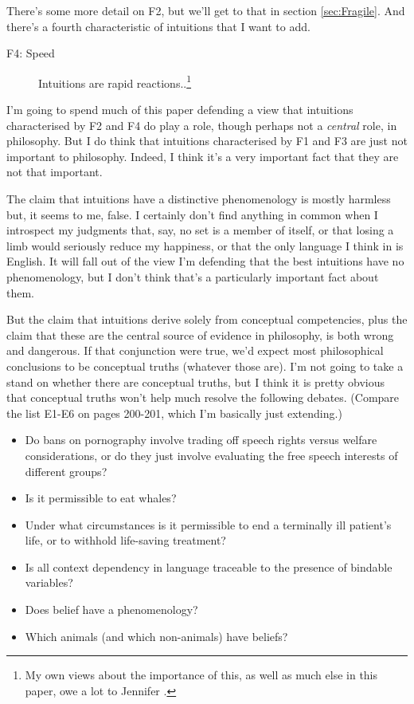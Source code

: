\noindent There's some more detail on F2, but we'll get to that in section \ref{sec:Fragile}. And there's a fourth characteristic of intuitions that I want to add.

\begin{description}
\item[F4: Speed] Intuitions are rapid reactions..\footnote{My own views about the importance of this, as well as much else in this paper, owe a lot to Jennifer \citet{Nagel2007, Nagel2013}.}
\end{description}

\noindent  I'm going to spend much of this paper defending a view that intuitions characterised by F2 and F4 do play a role, though perhaps not a \textit{central} role, in philosophy. But I do think that intuitions characterised by F1 and F3 are just not important to philosophy. Indeed, I think it's a very important fact that they are not that important.

The claim that intuitions have a distinctive phenomenology is mostly harmless but, it seems to me, false. I certainly don't find anything in common when I introspect my judgments that, say, no set is a member of itself, or that losing a limb would seriously reduce my happiness, or that the only language I think in is English. It will fall out of the view I'm defending that the best intuitions have no phenomenology, but I don't think that's a particularly important fact about them.

But the claim that intuitions derive solely from conceptual competencies, plus the claim that these are the central source of evidence in philosophy, is both wrong and dangerous. If that conjunction were true, we'd expect most philosophical conclusions to be conceptual truths (whatever those are). I'm not going to take a stand on whether there are conceptual truths, but I think it is pretty obvious that conceptual truths won't help much resolve the following debates. (Compare the list E1-E6 on pages 200-201, which I'm basically just extending.)

\begin{itemize}
\item Do bans on pornography involve trading off speech rights versus welfare considerations, or do they just involve evaluating the free speech interests of different groups?
\item Is it permissible to eat whales?
\item Under what circumstances is it permissible to end a terminally ill patient's life, or to withhold life-saving treatment?
\item Is all context dependency in language traceable to the presence of bindable variables?
\item Does belief have a phenomenology?
\item Which animals (and which non-animals) have beliefs?
\end{itemize}

